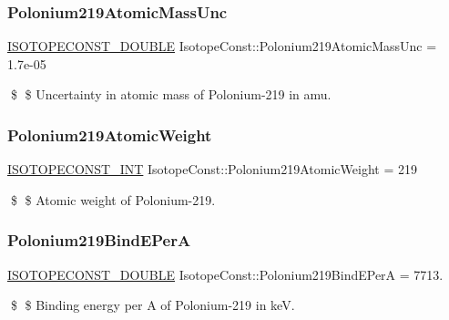 \subsubsection{\texorpdfstring{Polonium219\+Atomic\+Mass\+Unc}{Polonium219AtomicMassUnc}}
{\footnotesize\ttfamily \mbox{\hyperlink{group___isotope_const-_macros_ga8f45a7272ce02c0b4c65c44636ed719a}{I\+S\+O\+T\+O\+P\+E\+C\+O\+N\+S\+T\+\_\+\+D\+O\+U\+B\+LE}} Isotope\+Const\+::\+Polonium219\+Atomic\+Mass\+Unc = 1.\+7e-\/05}

\$ \$ Uncertainty in atomic mass of Polonium-\/219 in amu. \mbox{\label{group___isotope_const-_polonium-_po219_ga0c91313d76089c07ff08db2c7899dc25}} 
\subsubsection{\texorpdfstring{Polonium219\+Atomic\+Weight}{Polonium219AtomicWeight}}
{\footnotesize\ttfamily \mbox{\hyperlink{group___isotope_const-_macros_ga5f18360b3e99483a35c32d789e62621c}{I\+S\+O\+T\+O\+P\+E\+C\+O\+N\+S\+T\+\_\+\+I\+NT}} Isotope\+Const\+::\+Polonium219\+Atomic\+Weight = 219}

\$ \$ Atomic weight of Polonium-\/219. \mbox{\label{group___isotope_const-_polonium-_po219_gae92f503a0a0a25bfbd9789a785484bcc}} 
\subsubsection{\texorpdfstring{Polonium219\+Bind\+E\+PerA}{Polonium219BindEPerA}}
{\footnotesize\ttfamily \mbox{\hyperlink{group___isotope_const-_macros_ga8f45a7272ce02c0b4c65c44636ed719a}{I\+S\+O\+T\+O\+P\+E\+C\+O\+N\+S\+T\+\_\+\+D\+O\+U\+B\+LE}} Isotope\+Const\+::\+Polonium219\+Bind\+E\+PerA = 7713.}

\$ \$ Binding energy per A of Polonium-\/219 in keV. \mbox{\label{group___isotope_const-_polonium-_po219_gab9a3b912b3d262c12791ba10b2d60dba}} 
